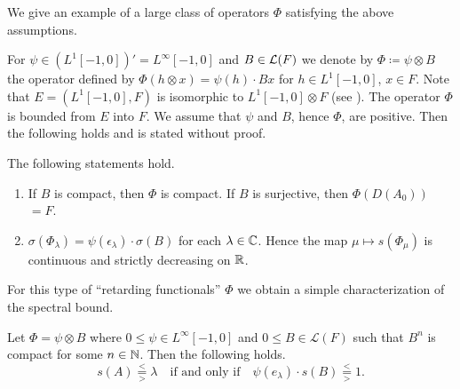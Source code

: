 \begin{example}\label{ex:c4-3.9}
%
We give an example of a large class of operators $\Phi$ satisfying the above assumptions.

For $\psi \in (L^{1}[-1,0])' = L^{\infty}[-1,0]$ and $B \in \mathcal{L}(F)$ we denote by $\Phi \coloneqq \psi \otimes B$ the operator defined by $\Phi(h \otimes x) = \psi(h) \cdot Bx$ for $h \in L^{1}[-1,0]$, $x \in F$.
Note that $E = (L^{1}[-1,0],F)$ is isomorphic to $L^{1}[-1,0] \otimes F$ (see \textcite[Chapter III,6.5]{schaefer:1966}).
The operator $\Phi$ is bounded from $E$ into $F$.
We assume that $\psi$ and $B$, hence $\Phi$, are positive.
Then the following holds and is stated without proof.
\begin{lemma*}\label{lem:c4-3.9-kgk}
%
The following statements hold.
\begin{enumerate}[\upshape (i), wide,labelindent=.25em] 
\item \label{lem:c4-3.9-kgk.1}
If\/ $B$ is compact, then $\Phi$ is compact. 
If\/ $B$ is surjective, then $\Phi(D(A_{0}))$ $= F$.

\item \label{lem:c4-3.9-kgk.2}
$\sigma(\Phi_{\lambda}) = \psi(\epsilon_{\lambda}) \cdot \sigma(B)$ for each $\lambda \in \mathbb{C}$. 
Hence the map $\mu \mapsto s(\Phi_{\mu})$ is continuous and strictly decreasing on $\mathbb{R}$.
\end{enumerate}
\end{lemma*}
\end{example}
For this type of \enquote{retarding functionals} $\Phi$ we obtain a simple characterization of the spectral bound.
\begin{corollary*}\label{cor:c4-3.9-kgk}
Let $\Phi = \psi \otimes B$ where $0 \leq \psi \in L^{\infty}[-1,0]$ and $0 \leq B \in \mathcal{L}(F)$ such that $B^{n}$ is compact for some $n \in \mathbb{N}$.
Then the following holds.
\begin{equation}\label{eq:c4-3.10}
s(A) \overset{<}{ \underset{>}{=} } \lambda \quad 
\text{if and only if} 
\quad 
\psi(e_{\lambda}) \cdot s(B) 
\overset{<}{ \underset{>}{=} } 1  .
\end{equation}
\end{corollary*}
